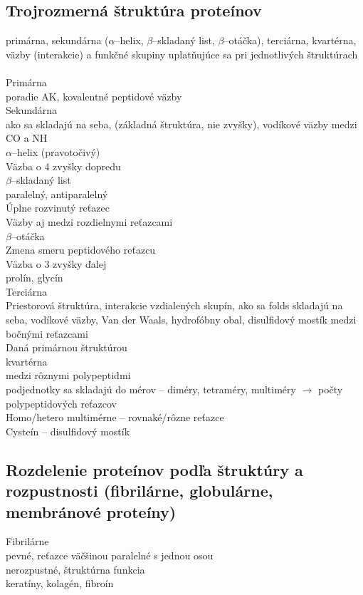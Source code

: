 \subsection*{Trojrozmerná štruktúra proteínov}
primárna, sekundárna ($\alpha$--helix, $\beta$--skladaný list, $\beta$--otáčka), terciárna, kvartérna, 
väzby (interakcie) a funkčné skupiny uplatňujúce sa pri jednotlivých štruktúrach\\
\\
Primárna\\
\tab poradie AK, kovalentné peptidové väzby\\
Sekundárna\\
\tab ako sa skladajú na seba, (základná štruktúra, nie zvyšky), vodíkové väzby medzi CO a NH\\
\tab $\alpha$--helix (pravotočivý)\\
\tab \tab Väzba o 4 zvyšky dopredu\\
\tab $\beta$--skladaný list\\
\tab \tab paralelný, antiparalelný\\
\tab \tab Úplne rozvinutý reťazec\\
\tab \tab Väzby aj medzi rozdielnymi reťazcami\\
\tab $\beta$--otáčka\\
\tab \tab Zmena smeru peptidového reťazcu\\
\tab \tab Väzba o 3 zvyšky ďalej\\
\tab \tab prolín, glycín\\
Terciárna\\
\tab Priestorová štruktúra, interakcie vzdialených skupín, ako sa folds skladajú na seba, vodíkové väzby, Van der Waals, hydrofóbny obal, disulfidový mostík medzi bočnými reťazcami\\
\tab Daná primárnou štruktúrou\\
kvartérna\\
\tab medzi rôznymi polypeptidmi\\
\tab podjednotky sa skladajú do mérov -- diméry, tetraméry, multiméry $\rightarrow$ počty polypeptidových reťazcov\\
\tab Homo/hetero multimérne -- rovnaké/rôzne reťazce\\
Cysteín -- disulfidový mostík\\

\subsection*{Rozdelenie proteínov podľa štruktúry a rozpustnosti (fibrilárne, globulárne, membránové proteíny)}
Fibrilárne\\
\tab pevné, reťazce väčšinou paralelné s jednou osou\\
\tab nerozpustné, štruktúrna funkcia\\
\tab keratíny, kolagén, fibroín\\

